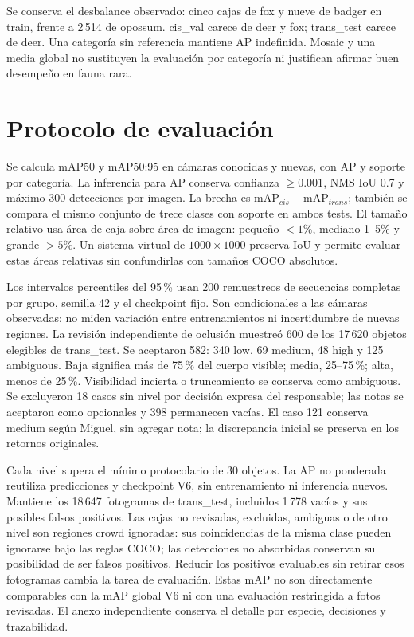 Se conserva el desbalance observado: cinco cajas de fox y nueve de badger en train,
frente a 2\,514 de opossum. cis\_val carece de deer y fox; trans\_test carece de deer.
Una categoría sin referencia mantiene AP indefinida. Mosaic y una media global no
sustituyen la evaluación por categoría ni justifican afirmar buen desempeño en fauna rara.

\section{Protocolo de evaluación}
Se calcula mAP50 y mAP50:95 en cámaras conocidas y nuevas, con AP y soporte por
categoría. La inferencia para AP conserva confianza $\geq0.001$, NMS IoU 0.7 y máximo
300 detecciones por imagen. La brecha es $\mathrm{mAP}_{cis}-\mathrm{mAP}_{trans}$;
también se compara el mismo conjunto de trece clases con soporte en ambos tests.
El tamaño relativo usa área de caja sobre área de imagen: pequeño $<1\%$,
mediano 1--5\% y grande $>5\%$. Un sistema virtual de $1000\times1000$ preserva
IoU y permite evaluar estas áreas relativas sin confundirlas con tamaños COCO absolutos.

Los intervalos percentiles del 95\,\% usan 200 remuestreos de secuencias completas
por grupo, semilla 42 y el checkpoint fijo. Son condicionales a las cámaras observadas;
no miden variación entre entrenamientos ni incertidumbre de nuevas regiones.
La revisión independiente de oclusión muestreó 600 de los 17\,620 objetos elegibles
de trans\_test. Se aceptaron 582: 340 low, 69 medium, 48 high y 125 ambiguous.
Baja significa más de 75\,\% del cuerpo visible; media, 25--75\,\%; alta, menos
de 25\,\%. Visibilidad incierta o truncamiento se conserva como ambiguous.
Se excluyeron 18 casos sin nivel por decisión expresa del responsable; las notas
se aceptaron como opcionales y 398 permanecen vacías. El caso 121 conserva medium
según Miguel, sin agregar nota; la discrepancia inicial se preserva en los retornos originales.

Cada nivel supera el mínimo protocolario de 30 objetos. La AP no ponderada reutiliza
predicciones y checkpoint V6, sin entrenamiento ni inferencia nuevos. Mantiene los
18\,647 fotogramas de trans\_test, incluidos 1\,778 vacíos y sus posibles falsos
positivos. Las cajas no revisadas, excluidas, ambiguas o de otro nivel son regiones
crowd ignoradas: sus coincidencias de la misma clase pueden ignorarse bajo las reglas
COCO; las detecciones no absorbidas conservan su posibilidad de ser falsos positivos.
Reducir los positivos evaluables sin retirar esos fotogramas cambia la tarea de
evaluación. Estas mAP no son directamente comparables con la mAP global V6 ni con
una evaluación restringida a fotos revisadas. El anexo independiente conserva el
detalle por especie, decisiones y trazabilidad.

